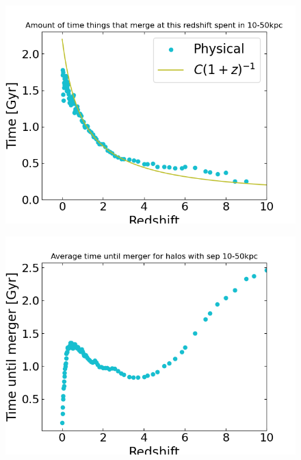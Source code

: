 \documentclass[twocolumn]{aastex631}
\begin{document}
\begin{figure}[htb]
    \centering
    \includegraphics[width=0.5\columnwidth]{plots/bet-on-it/3_timeinbin_beforemerger.png}
\end{figure}
\begin{figure}[htb]
    \centering
    \includegraphics[width=0.5\columnwidth]{plots/bet-on-it/3_timeinbin_untilmerger_phys.png}
\end{figure}









{}

\end{document}
